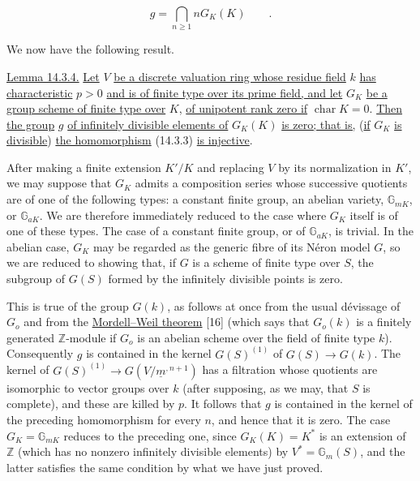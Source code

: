 \begin{equation*}
 g=\bigcap_{n\geq1}nG_K(K)\qquad .
\end{equation*}

We now have the following result.

\medskip
\noindent
\underline{Lemma 14.3.4.}  \underline{Let} $V$ \underline{be a
discrete valuation ring whose residue field} $k$ \underline{has
characteristic} $p>0$ \underline{and is of finite type over its prime
field, and let} $G_K$ \underline{be a group scheme of finite type over}
$K$, \underline{of unipotent rank zero if} $\operatorname{char}K=0$.
\underline{Then the group} $g$ \underline{of infinitely divisible
elements of} $G_K(K)$ \underline{is zero; that is,} (\underline{if}
$G_K$ \underline{is divisible}) \underline{the homomorphism} (14.3.3)
\underline{is injective}.

After making a finite extension $K'/K$ and replacing $V$ by its
normalization in $K'$, we may suppose that $G_K$ admits a composition
series whose successive quotients are of one of the following types:
a constant finite group, an abelian variety, $\mathbb G_{mK}$, or
$\mathbb G_{aK}$.  We are therefore immediately reduced to the case
where $G_K$ itself is of one of these types.  The case of a constant
finite group, or of $\mathbb G_{aK}$, is trivial.  In the abelian case,
$G_K$ may be regarded as the generic fibre of its N\'{e}ron model $G$,
so we are reduced to showing that, if $G$ is a scheme of finite type
over $S$, the subgroup of $G(S)$ formed by the infinitely divisible
points is zero.

This is true of the group $G(k)$, as follows at once from the usual
d\'{e}vissage of $G_o$ and from the \underline{Mordell--Weil theorem}
[16] (which says that $G_o(k)$ is a finitely generated $\mathbb Z$-module
if $G_o$ is an abelian scheme over the field of finite type $k$).
Consequently $g$ is contained in the kernel $G(S)^{(1)}$ of
$G(S)\longrightarrow G(k)$.  The kernel of
$G(S)^{(1)}\longrightarrow G(V/\underline m^{,n+1})$ has a filtration
whose quotients are isomorphic to vector groups over $k$ (after
supposing, as we may, that $S$ is complete), and these are killed by
$p$.  It follows that $g$ is contained in the kernel of the preceding
homomorphism for every $n$, and hence that it is zero.  The case
$G_K=\mathbb G_{mK}$ reduces to the preceding one, since
$G_K(K)=K^*$ is an extension of $\mathbb Z$ (which has no nonzero
infinitely divisible elements) by
$V^*=\mathbb G_m(S)$, and the latter satisfies the same condition by
what we have just proved.

